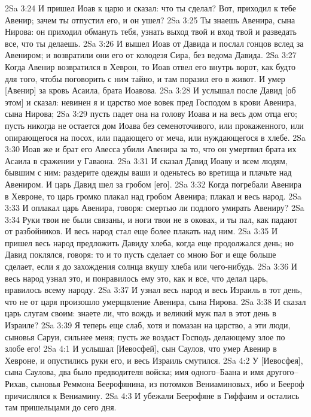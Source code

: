 2Sa 3:24  И пришел Иоав к царю и сказал: что ты сделал? Вот, приходил к тебе Авенир; зачем ты отпустил его, и он ушел?
2Sa 3:25  Ты знаешь Авенира, сына Нирова: он приходил обмануть тебя, узнать выход твой и вход твой и разведать все, что ты делаешь.
2Sa 3:26  И вышел Иоав от Давида и послал гонцов вслед за Авениром; и возвратили они его от колодезя Сира, без ведома Давида.
2Sa 3:27  Когда Авенир возвратился в Хеврон, то Иоав отвел его внутрь ворот, как будто для того, чтобы поговорить с ним тайно, и там поразил его в живот. И умер [Авенир] за кровь Асаила, брата Иоавова.
2Sa 3:28  И услышал после Давид [об этом] и сказал: невинен я и царство мое вовек пред Господом в крови Авенира, сына Нирова;
2Sa 3:29  пусть падет она на голову Иоава и на весь дом отца его; пусть никогда не остается дом Иоава без семеноточивого, или прокаженного, или опирающегося на посох, или падающего от меча, или нуждающегося в хлебе.
2Sa 3:30  Иоав же и брат его Авесса убили Авенира за то, что он умертвил брата их Асаила в сражении у Гаваона.
2Sa 3:31  И сказал Давид Иоаву и всем людям, бывшим с ним: раздерите одежды ваши и оденьтесь во вретища и плачьте над Авениром. И царь Давид шел за гробом [его].
2Sa 3:32  Когда погребали Авенира в Хевроне, то царь громко плакал над гробом Авенира; плакал и весь народ.
2Sa 3:33  И оплакал царь Авенира, говоря: смертью ли подлого умирать Авениру?
2Sa 3:34  Руки твои не были связаны, и ноги твои не в оковах, и ты пал, как падают от разбойников. И весь народ стал еще более плакать над ним.
2Sa 3:35  И пришел весь народ предложить Давиду хлеба, когда еще продолжался день; но Давид поклялся, говоря: то и то пусть сделает со мною Бог и еще больше сделает, если я до захождения солнца вкушу хлеба или чего-нибудь.
2Sa 3:36  И весь народ узнал это, и понравилось ему это, как и все, что делал царь, нравилось всему народу.
2Sa 3:37  И узнал весь народ и весь Израиль в тот день, что не от царя произошло умерщвление Авенира, сына Нирова.
2Sa 3:38  И сказал царь слугам своим: знаете ли, что вождь и великий муж пал в этот день в Израиле?
2Sa 3:39  Я теперь еще слаб, хотя и помазан на царство, а эти люди, сыновья Саруи, сильнее меня; пусть же воздаст Господь делающему злое по злобе его!
2Sa 4:1  И услышал [Иевосфей], сын Саулов, что умер Авенир в Хевроне, и опустились руки его, и весь Израиль смутился.
2Sa 4:2  У [Иевосфея], сына Саулова, два было предводителя войска; имя одного--Баана и имя другого--Рихав, сыновья Реммона Беерофянина, из потомков Вениаминовых, ибо и Беероф причислялся к Вениамину.
2Sa 4:3  И убежали Беерофяне в Гиффаим и остались там пришельцами до сего дня.
